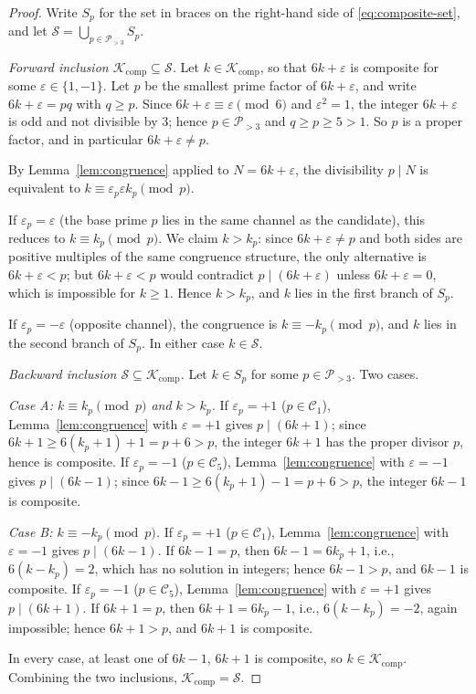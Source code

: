 \documentclass[11pt]{amsart}
\numberwithin{equation}{section}
\newcommand{\cP}{\mathcal{P}}
\newcommand{\cK}{\mathcal{K}}
\newcommand{\cS}{\mathcal{S}}
\newcommand{\Cone}{\mathcal{C}_1}
\newcommand{\Cfive}{\mathcal{C}_5}
\theoremstyle{plain}
\theoremstyle{definition}
\begin{document}
\begin{proof}
Write $S_p$ for the set in braces on the right-hand side of
\eqref{eq:composite-set}, and let $\cS=\bigcup_{p\in\cP_{>3}}S_p$.

\emph{Forward inclusion $\cK_{\mathrm{comp}}\subseteq\cS$.}
Let $k\in\cK_{\mathrm{comp}}$, so that $6k+\varepsilon$ is composite
for some $\varepsilon\in\{1,-1\}$. Let $p$ be the smallest prime
factor of $6k+\varepsilon$, and write $6k+\varepsilon=pq$ with
$q\ge p$. Since $6k+\varepsilon\equiv\varepsilon\pmod 6$ and
$\varepsilon^2=1$, the integer $6k+\varepsilon$ is odd and not
divisible by $3$; hence $p\in\cP_{>3}$ and $q\ge p\ge 5>1$. So $p$ is
a proper factor, and in particular $6k+\varepsilon\neq p$.

By Lemma~\ref{lem:congruence} applied to $N=6k+\varepsilon$, the
divisibility $p\mid N$ is equivalent to
$k\equiv\varepsilon_p\varepsilon k_p\pmod p$.

If $\varepsilon_p=\varepsilon$ (the base prime $p$ lies in the same
channel as the candidate), this reduces to $k\equiv k_p\pmod p$. We
claim $k>k_p$: since $6k+\varepsilon\neq p$ and both sides are positive
multiples of the same congruence structure, the only alternative is
$6k+\varepsilon<p$; but $6k+\varepsilon<p$ would contradict
$p\mid(6k+\varepsilon)$ unless $6k+\varepsilon=0$, which is impossible
for $k\ge 1$. Hence $k>k_p$, and $k$ lies in the first branch of
$S_p$.

If $\varepsilon_p=-\varepsilon$ (opposite channel), the congruence is
$k\equiv-k_p\pmod p$, and $k$ lies in the second branch of $S_p$. In
either case $k\in\cS$.

\emph{Backward inclusion $\cS\subseteq\cK_{\mathrm{comp}}$.}
Let $k\in S_p$ for some $p\in\cP_{>3}$. Two cases.

\emph{Case A: $k\equiv k_p\pmod p$ and $k>k_p$.}
If $\varepsilon_p=+1$ ($p\in\Cone$), Lemma~\ref{lem:congruence} with
$\varepsilon=+1$ gives $p\mid(6k+1)$; since
$6k+1\ge 6(k_p+1)+1=p+6>p$, the integer $6k+1$ has the proper divisor
$p$, hence is composite. If $\varepsilon_p=-1$ ($p\in\Cfive$),
Lemma~\ref{lem:congruence} with $\varepsilon=-1$ gives $p\mid(6k-1)$;
since $6k-1\ge 6(k_p+1)-1=p+6>p$, the integer $6k-1$ is composite.

\emph{Case B: $k\equiv-k_p\pmod p$.}
If $\varepsilon_p=+1$ ($p\in\Cone$), Lemma~\ref{lem:congruence} with
$\varepsilon=-1$ gives $p\mid(6k-1)$. If $6k-1=p$, then
$6k-1=6k_p+1$, i.e., $6(k-k_p)=2$, which has no solution in integers;
hence $6k-1>p$, and $6k-1$ is composite. If $\varepsilon_p=-1$
($p\in\Cfive$), Lemma~\ref{lem:congruence} with $\varepsilon=+1$ gives
$p\mid(6k+1)$. If $6k+1=p$, then $6k+1=6k_p-1$, i.e.,
$6(k-k_p)=-2$, again impossible; hence $6k+1>p$, and $6k+1$ is
composite.

In every case, at least one of $6k-1$, $6k+1$ is composite, so
$k\in\cK_{\mathrm{comp}}$. Combining the two inclusions,
$\cK_{\mathrm{comp}}=\cS$.
\end{proof}
\end{document}
